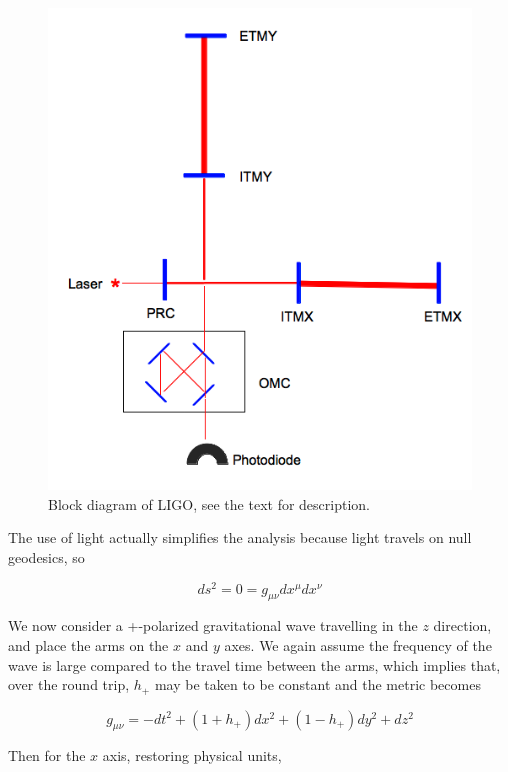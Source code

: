 \begin{figure}
  \includegraphics[width=\linewidth]{figures/detectors/LIGO}
  \caption[Block diagram of LIGO]{
  \label{f:ligo}
Block diagram of LIGO, see the text for description.
}
\end{figure}%
The use of light actually simplifies the analysis because light
travels on null geodesics, so

\begin{equation*}
ds^2 = 0 = g_{\mu\nu} dx^\mu dx^\nu
\end{equation*}

We now consider a +-polarized gravitational wave travelling in the $z$
direction, and place the arms on the $x$ and $y$ axes.  We again
assume the frequency of the wave is large compared to the travel time
between the arms, which implies that, over the round trip, $h_+$ may be
taken to be constant and the metric becomes

\begin{equation*}
g_{\mu\nu} = -dt^2 + (1+h_+) dx^2 + (1-h_+) dy^2 + dz^2
\end{equation*}

Then for the $x$ axis, restoring physical units,

